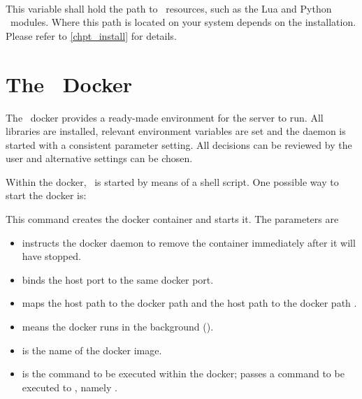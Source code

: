 \\
This variable shall hold the path to \nowdb\ resources,
such as the Lua and Python \nowdb\ modules. Where this
path is located on your system depends on the installation.
Please refer to \ref{chpt_install} for details.

\section{The \nowdb\ Docker}
The \nowdb\ docker provides a ready-made environment
for the server to run. All libraries are installed,
relevant environment variables are set and the daemon
is started with a consistent parameter setting.
All decisions can be reviewed by the user and alternative
settings can be chosen.

Within the docker, \nowdb\ is started
by means of a shell script.
One possible way to start the docker is:


This command creates the docker container and starts it.
The parameters are
\begin{itemize}
\item {}
instructs the docker daemon to remove
the container immediately after it will have stopped.

\item {} binds the host port 
to the same docker port.

\item {} maps the host path
 to the docker path  and
the host path  to the docker path .

\item {} means the docker runs in the background
().

\item {} is the name of the docker image.

\item {} is the command to be executed
within the docker;  passes a command
to be executed to ,
namely .
\end{itemize}

